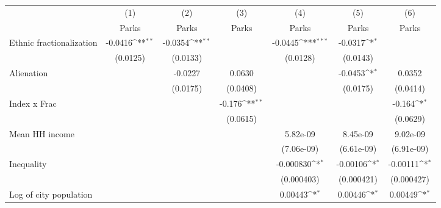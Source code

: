 {
\def\sym#1{\ifmmode^{#1}\else\(^{#1}\)\fi}
\begin{tabular}{l*{6}{c}}
\hline\hline
                    &\multicolumn{1}{c}{(1)}&\multicolumn{1}{c}{(2)}&\multicolumn{1}{c}{(3)}&\multicolumn{1}{c}{(4)}&\multicolumn{1}{c}{(5)}&\multicolumn{1}{c}{(6)}\\
                    &\multicolumn{1}{c}{Parks}&\multicolumn{1}{c}{Parks}&\multicolumn{1}{c}{Parks}&\multicolumn{1}{c}{Parks}&\multicolumn{1}{c}{Parks}&\multicolumn{1}{c}{Parks}\\
\hline
Ethnic fractionalization&     -0.0416\sym{**} &     -0.0354\sym{**} &                     &     -0.0445\sym{***}&     -0.0317\sym{*}  &                     \\
                    &    (0.0125)         &    (0.0133)         &                     &    (0.0128)         &    (0.0143)         &                     \\
[1em]
Alienation          &                     &     -0.0227         &      0.0630         &                     &     -0.0453\sym{*}  &      0.0352         \\
                    &                     &    (0.0175)         &    (0.0408)         &                     &    (0.0175)         &    (0.0414)         \\
[1em]
Index x Frac        &                     &                     &      -0.176\sym{**} &                     &                     &      -0.164\sym{*}  \\
                    &                     &                     &    (0.0615)         &                     &                     &    (0.0629)         \\
[1em]
Mean HH income      &                     &                     &                     &    5.82e-09         &    8.45e-09         &    9.02e-09         \\
                    &                     &                     &                     &  (7.06e-09)         &  (6.61e-09)         &  (6.91e-09)         \\
[1em]
Inequality          &                     &                     &                     &   -0.000830\sym{*}  &    -0.00106\sym{*}  &    -0.00111\sym{*}  \\
                    &                     &                     &                     &  (0.000403)         &  (0.000421)         &  (0.000427)         \\
[1em]
Log of city population&                     &                     &                     &     0.00443\sym{*}  &     0.00446\sym{*}  &     0.00449\sym{*}  \\

\end{tabular}}
